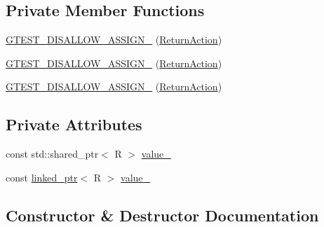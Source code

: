\subsection*{Private Member Functions}
\begin{DoxyCompactItemize}
\item 
\mbox{\hyperlink{classtesting_1_1internal_1_1_return_action_a213aa7089e1caf147a736aa283789045}{G\+T\+E\+S\+T\+\_\+\+D\+I\+S\+A\+L\+L\+O\+W\+\_\+\+A\+S\+S\+I\+G\+N\+\_\+}} (\mbox{\hyperlink{classtesting_1_1internal_1_1_return_action}{Return\+Action}})
\item 
\mbox{\hyperlink{classtesting_1_1internal_1_1_return_action_a213aa7089e1caf147a736aa283789045}{G\+T\+E\+S\+T\+\_\+\+D\+I\+S\+A\+L\+L\+O\+W\+\_\+\+A\+S\+S\+I\+G\+N\+\_\+}} (\mbox{\hyperlink{classtesting_1_1internal_1_1_return_action}{Return\+Action}})
\item 
\mbox{\hyperlink{classtesting_1_1internal_1_1_return_action_a213aa7089e1caf147a736aa283789045}{G\+T\+E\+S\+T\+\_\+\+D\+I\+S\+A\+L\+L\+O\+W\+\_\+\+A\+S\+S\+I\+G\+N\+\_\+}} (\mbox{\hyperlink{classtesting_1_1internal_1_1_return_action}{Return\+Action}})
\end{DoxyCompactItemize}
\subsection*{Private Attributes}
\begin{DoxyCompactItemize}
\item 
const std\+::shared\+\_\+ptr$<$ R $>$ \mbox{\hyperlink{classtesting_1_1internal_1_1_return_action_a491f0f98ad41a5f864dafdacd30abf03}{value\+\_\+}}
\item 
const \mbox{\hyperlink{classtesting_1_1internal_1_1linked__ptr}{linked\+\_\+ptr}}$<$ R $>$ \mbox{\hyperlink{classtesting_1_1internal_1_1_return_action_a321f509b255d1651234f53e8b064d98d}{value\+\_\+}}
\end{DoxyCompactItemize}


\subsection{Constructor \& Destructor Documentation}
\mbox{\label{classtesting_1_1internal_1_1_return_action_af65344e503dae3ab36b4fd6d1ede6fb7}} 
